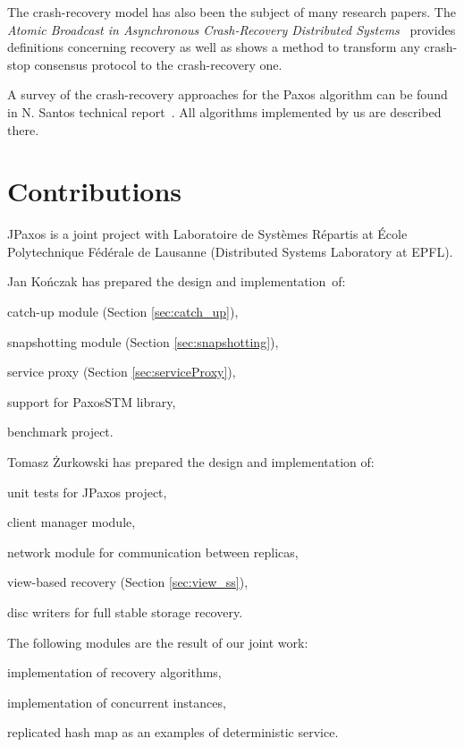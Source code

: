 The crash-recovery model has also been the subject of many research papers. \linebreak The \textit{Atomic Broadcast in Asynchronous Crash-Recovery Distributed Systems}~\cite{rodriguez2000atomic} provides definitions concerning recovery as well as shows a method to transform any crash-stop consensus protocol to the crash-recovery one.

A survey of the crash-recovery approaches for the Paxos algorithm can be found in N. Santos technical report~\cite{Nun10}. All algorithms implemented by us are described there.

\section{Contributions}

JPaxos is a joint project with Laboratoire de Systèmes Répartis at École Polytechnique Fédérale de Lausanne (Distributed Systems Laboratory at EPFL).

\noindent Jan Kończak has prepared the design and implementation~of:
\begin{tightList}
  \item[\textbullet] catch-up module (Section \ref{sec:catch_up}),
  \item[\textbullet] snapshotting module (Section \ref{sec:snapshotting}),
  \item[\textbullet] service proxy  (Section \ref{sec:serviceProxy}),
  \item[\textbullet] support for PaxosSTM library,
  \item[\textbullet] benchmark project.
\end{tightList}

\noindent Tomasz Żurkowski has prepared the design and implementation of:
\begin{tightList}
  \item[\textbullet] unit tests for JPaxos project,
  \item[\textbullet] client manager module, 
  \item[\textbullet] network module for communication between replicas,
  \item[\textbullet] view-based recovery (Section \ref{sec:view_ss}),
  \item[\textbullet] disc writers for full stable storage recovery.
\end{tightList}

\noindent The following modules are the result of our joint work:
\begin{tightList}
  \item[\textbullet] implementation of recovery algorithms,
  \item[\textbullet] implementation of concurrent instances,
  \item[\textbullet] replicated hash map as an examples of deterministic service.
\end{tightList}

